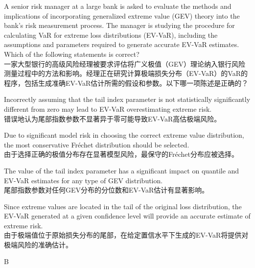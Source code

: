 \documentclass{article}
\newcounter{question} %
\begin{document}
\begin{question}
    A senior risk manager at a large bank is asked to evaluate the methods and implications of incorporating generalized extreme value (GEV) theory into the bank's risk measurement process. The manager is studying the procedure for calculating VaR for extreme loss distributions (EV-VaR), including the assumptions and parameters required to generate accurate EV-VaR estimates. Which of the following statements is correct?
    \\一家大型银行的高级风险经理被要求评估将广义极值（GEV）理论纳入银行风险测量过程中的方法和影响。经理正在研究计算极端损失分布（EV-VaR）的VaR的程序，包括生成准确EV-VaR估计所需的假设和参数。以下哪一项陈述是正确的？
\end{question}

\begin{choices}
    \item Incorrectly assuming that the tail index parameter is not statistically significantly different from zero may lead to EV-VaR overestimating extreme risk.\\
        错误地认为尾部指数参数不显著异于零可能导致EV-VaR高估极端风险。
    \item Due to significant model risk in choosing the correct extreme value distribution, the most conservative Fréchet distribution should be selected.\\
        由于选择正确的极值分布存在显著模型风险，最保守的Fréchet分布应被选择。
    \item The value of the tail index parameter has a significant impact on quantile and EV-VaR estimates for any type of GEV distribution.\\
        尾部指数参数对任何GEV分布的分位数和EV-VaR估计有显著影响。
    \item Since extreme values are located in the tail of the original loss distribution, the EV-VaR generated at a given confidence level will provide an accurate estimate of extreme risk.\\
        由于极端值位于原始损失分布的尾部，在给定置信水平下生成的EV-VaR将提供对极端风险的准确估计。
\end{choices}

\begin{correctanswer}
    B
\end{correctanswer}
\end{document}
